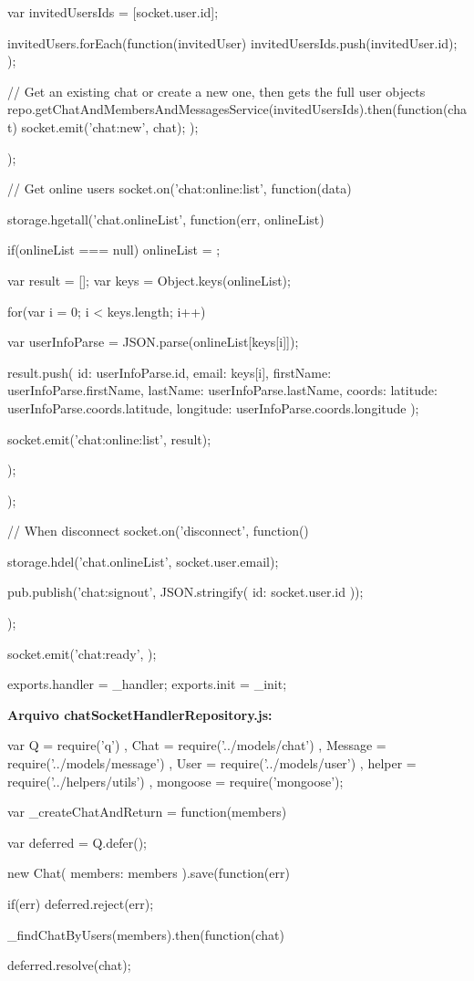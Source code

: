 \begin{flushleft}
{{		var invitedUsersIds = [socket.user.id];
		
		invitedUsers.forEach(function(invitedUser) {
			invitedUsersIds.push(invitedUser.id);
		});
		
		// Get an existing chat or create a new one, then gets the full user objects
		repo.getChatAndMembersAndMessagesService(invitedUsersIds).then(function(chat) {
			socket.emit('chat:new', chat);
		});
		
	});
	
	// Get online users
	socket.on('chat:online:list', function(data) {
		storage.hgetall('chat.onlineList', function(err, onlineList) { 
			if(onlineList === null)
			onlineList = {};
			
			var result = [];
			var keys = Object.keys(onlineList);
			
			for(var i = 0; i < keys.length; i++) {
				var userInfoParse = JSON.parse(onlineList[keys[i]]);
				
				result.push({
					id: userInfoParse.id,
					email: keys[i],
					firstName: userInfoParse.firstName,
					lastName: userInfoParse.lastName,
					coords: {
						latitude: userInfoParse.coords.latitude,
						longitude: userInfoParse.coords.longitude
					}
				});
				
			}
			
			socket.emit('chat:online:list', result);
		});
	});
	
	// When disconnect
	socket.on('disconnect', function() {
		storage.hdel('chat.onlineList', socket.user.email);
		
		pub.publish('chat:signout', JSON.stringify({
			id: socket.user.id
		}));
	});
	
	socket.emit('chat:ready', {});
}

exports.handler = \_handler;
exports.init = \_init;

\textbf{Arquivo chatSocketHandlerRepository.js:}

var Q = require('q')
, Chat = require('../models/chat')
, Message = require('../models/message')
, User = require('../models/user')
, helper = require('../helpers/utils')
, mongoose = require('mongoose');

var \_createChatAndReturn = function(members) {
	var deferred = Q.defer();
	
	new Chat({
		members: members
	}).save(function(err) {
	if(err)
	deferred.reject(err);
	
	\_findChatByUsers(members).then(function(chat) {
		deferred.resolve(chat);
		
}}}
\end{flushleft}
